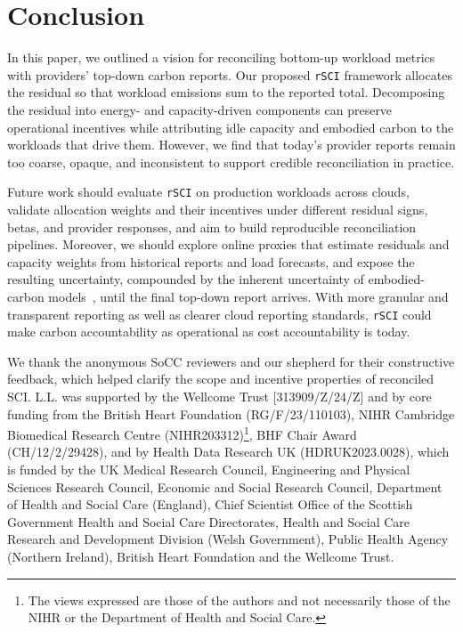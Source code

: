 \documentclass[sigconf,screen,nonacm]{acmart}
\newcommand{\RSCI}{\texttt{rSCI}\xspace}
\begin{document}
\section{Conclusion}
\label{sec:future}

In this paper, we outlined a vision for reconciling bottom-up workload metrics with providers' top-down carbon reports.
Our proposed \RSCI framework allocates the residual so that workload emissions sum to the reported total.
Decomposing the residual into energy- and capacity-driven components can preserve operational incentives while attributing idle capacity and embodied carbon to the workloads that drive them.
However, we find that today's provider reports remain too coarse, opaque, and inconsistent to support credible reconciliation in practice.

Future work should evaluate \RSCI on production workloads across clouds, validate allocation weights and their incentives under different residual signs, betas, and provider responses, and aim to build reproducible reconciliation pipelines.
Moreover, we should explore online proxies that estimate residuals and capacity weights from historical reports and load forecasts, and expose the resulting uncertainty, compounded by the inherent uncertainty of embodied-carbon models~\cite{bhagavathula2024uncertainty}, until the final top-down report arrives.
With more granular and transparent reporting as well as clearer cloud reporting standards, \RSCI could make carbon accountability as operational as cost accountability is today.

\begin{acks}
We thank the anonymous SoCC reviewers and our shepherd for their constructive feedback, which helped clarify the scope and incentive properties of reconciled SCI.
L.L. was supported by the Wellcome Trust [313909/Z/24/Z] and by core funding from the British Heart Foundation (RG/F/23/110103), NIHR Cambridge Biomedical Research Centre (NIHR203312)\footnote{The views expressed are those of the authors and not necessarily those of the NIHR or the Department of Health and Social Care.}, BHF Chair Award (CH/12/2/29428), and by Health Data Research UK (HDRUK2023.0028), which is funded by the UK Medical Research Council, Engineering and Physical Sciences Research Council, Economic and Social Research Council, Department of Health and Social Care (England), Chief Scientist Office of the Scottish Government Health and Social Care Directorates, Health and Social Care Research and Development Division (Welsh Government), Public Health Agency (Northern Ireland), British Heart Foundation and the Wellcome Trust.
\end{acks}




\clearpage
\appendix
\onecolumn

\clearpage

\end{document}
